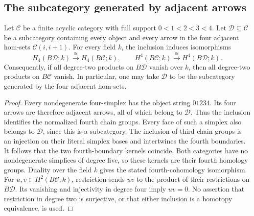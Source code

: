 \subsection{The subcategory generated by adjacent arrows}

\begin{lemma}
\label{A7:adjacent-generated-top-homology}
Let $\mathcal C$ be a finite acyclic category with full support
$0<1<2<3<4$.  Let $\mathcal D\subseteq\mathcal C$ be a
subcategory containing every object and every arrow in the four
adjacent hom-sets $\mathcal C(i,i+1)$.  For every field $k$,
the inclusion induces isomorphisms
\[
 H_4(B\mathcal D;k)\xrightarrow{\cong}H_4(B\mathcal C;k),
 \qquad
 H^4(B\mathcal C;k)\xrightarrow{\cong}H^4(B\mathcal D;k).
\]
Consequently, if all degree-two products on $B\mathcal D$ vanish
over $k$, then all degree-two products on $B\mathcal C$ vanish.
In particular, one may take $\mathcal D$ to be the subcategory
generated by the four adjacent hom-sets.
\end{lemma}
\begin{proof}
Every nondegenerate four-simplex has the object string $01234$.
Its four arrows are therefore adjacent arrows, all of which
belong to $\mathcal D$.  Thus the inclusion identifies the
normalized fourth chain groups.  Every face of such a simplex
also belongs to $\mathcal D$, since this is a subcategory.
The inclusion of third chain groups is an injection on their
literal simplex bases and intertwines the fourth boundaries.
It follows that the two fourth-boundary kernels coincide.
Both categories have no nondegenerate simplices of degree five,
so these kernels are their fourth homology groups.  Duality
over the field $k$ gives the stated fourth-cohomology
isomorphism.  For $u,v\in H^2(B\mathcal C;k)$, restriction
sends $uv$ to the product of their restrictions on
$B\mathcal D$.  Its vanishing and injectivity in degree four
imply $uv=0$.  No assertion that restriction in degree two is
surjective, or that either inclusion is a homotopy equivalence,
is used.
\end{proof}

